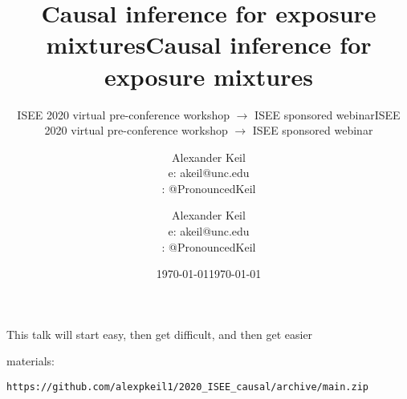 \documentclass[aspectratio=169]{beamer}
\title{Causal inference for exposure mixtures}
\subtitle{ISEE 2020 virtual pre-conference workshop $\rightarrow$ ISEE sponsored webinar}
\author{Alexander Keil\\e: akeil@unc.edu\\  \faTwitter: @PronouncedKeil}
\date{\today}
\begin{document}
\frame{\maketitle}

\begin{frame}[t, fragile]
  \frametitle{}
    This talk will start easy, then get difficult, and then get easier
    \bigskip
    
    
    materials: 
\begin{lstlisting}
https://github.com/alexpkeil1/2020_ISEE_causal/archive/main.zip
\end{lstlisting}

\end{frame}



















\title{Causal inference for exposure mixtures}
\subtitle{ISEE 2020 virtual pre-conference workshop $\rightarrow$ ISEE sponsored webinar}
\author{Alexander Keil\\e: akeil@unc.edu\\  \faTwitter: @PronouncedKeil}
\date{\today}
\frame{\maketitle}
\end{document}
